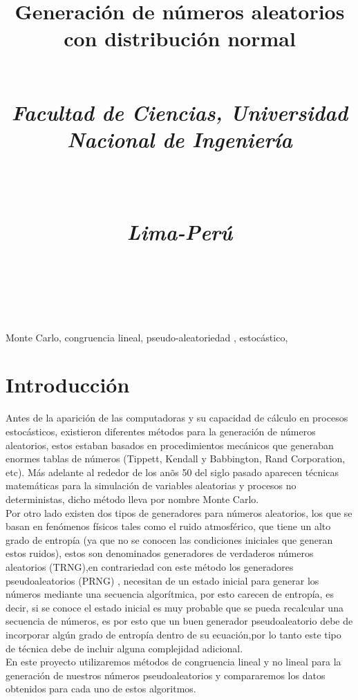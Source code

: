 \documentclass[conference]{IEEEtran}
\begin{document}
\title{Generaci\'on de n\'umeros aleatorios con distribuci\'on normal\\
\\
\centerline{\textit{Facultad de Ciencias, Universidad Nacional de Ingenier\'ia}}\\
\centerline{\textit{Lima-Per\'u}}\\
\author{}
}
\maketitle
\begin{abstract}

\end{abstract}
\begin{IEEEkeywords}
Monte Carlo, congruencia lineal, pseudo-aleatoriedad , estoc\'astico, 
\end{IEEEkeywords}

\section{Introducci\'on}
Antes de la aparici\'on de las computadoras y su capacidad de c\'alculo en procesos estoc\'asticos, existieron diferentes m\'etodos para la generaci\'on de n\'umeros aleatorios, estos estaban basados en procedimientos mec\'anicos que generaban enormes tablas de n\'umeros (Tippett, Kendall y Babbington, Rand Corporation, etc). M\'as adelante al rededor de los an\~os 50 del siglo pasado aparecen t\'ecnicas matem\'aticas para la simulaci\'on de variables aleatorias y procesos no deterministas, dicho m\'etodo lleva por nombre Monte Carlo.\\
Por otro lado existen dos tipos de generadores para n\'umeros aleatorios, los que se basan en fen\'omenos f\'isicos tales como el ruido atmosf\'erico, que tiene un alto grado de entrop\'ia (ya que no se conocen las condiciones iniciales que generan estos ruidos), estos son denominados generadores de verdaderos n\'umeros aleatorios (TRNG),en contrariedad con este m\'etodo los generadores pseudoaleatorios (PRNG) \cite{b1}, necesitan de un estado inicial para generar los n\'umeros mediante una secuencia algor\'itmica, por esto carecen de entrop\'ia, es decir, si se conoce el estado inicial es muy probable que se pueda recalcular una secuencia de n\'umeros, es por esto que un buen generador pseudoaleatorio debe de incorporar alg\'un grado de entrop\'ia dentro de su ecuaci\'on,por lo tanto este tipo de t\'ecnica debe de incluir alguna complejidad adicional.\\
En este proyecto utilizaremos m\'etodos de congruencia lineal y no lineal\cite{b2} para la generaci\'on de nuestros n\'umeros pseudoaleatorios y compararemos los datos obtenidos para cada uno de estos algoritmos.
\end{document}
